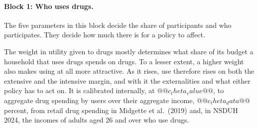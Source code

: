 \documentclass[10pt]{article}
\begin{document}
\paragraph{Block 1: Who uses drugs.}  The five parameters in this block decide the share of participants and who participates.  They decide how much there is for a policy to affect.
\begin{description}\setlength{\itemsep}{0.25em}\setlength{\parskip}{0em}
\item[$\theta$, the weight on drugs in utility.]
  The weight in utility given to drugs mostly determines what share of its budget a household that uses drugs spends on drugs. To a lesser extent, a higher weight also makes using at all more attractive. As it rises, use therefore rises on both the extensive and the intensive margin, and with it the externalities and what either policy has to act on. It is calibrated internally, at $@@c_theta_value@@$, to aggregate drug spending by users over their aggregate income, $@@c_theta_data@@$ percent, from retail drug spending in Midgette et al.\ (2019) and, in NSDUH 2024, the incomes of adults aged 26 and over who use drugs.


\end{description}
\end{document}
